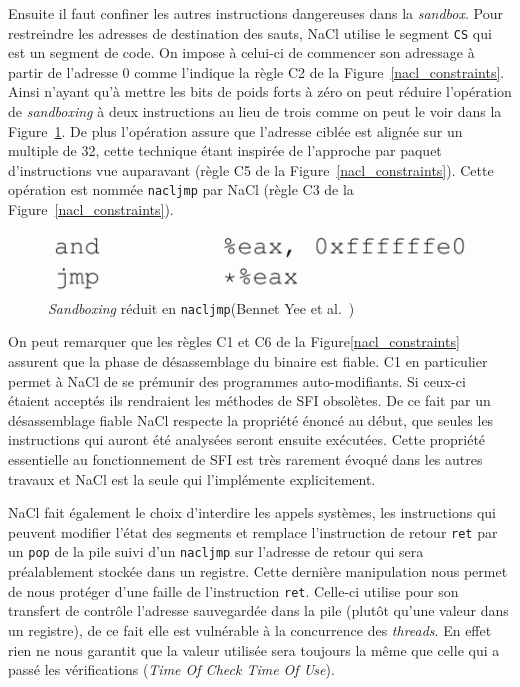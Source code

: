 \documentclass[11pt]{sdm}
\begin{document}
Ensuite il faut confiner les autres instructions dangereuses dans la \textit{sandbox}. Pour restreindre les adresses de destination des sauts, NaCl utilise le segment \texttt{CS} qui est un segment de code. On impose à celui-ci de commencer son adressage à partir de l'adresse 0 comme l'indique la règle C2 de la Figure~\ref{nacl_constraints}. Ainsi n'ayant qu'à mettre les bits de poids forts à zéro on peut réduire l'opération de \textit{sandboxing} à deux instructions au lieu de trois comme on peut le voir dans la Figure~\ref{nacl_jump}. De plus l'opération assure que l'adresse ciblée est alignée sur un multiple de 32, cette technique étant inspirée de l'approche par paquet d'instructions vue auparavant (règle C5 de la Figure~\ref{nacl_constraints}). Cette opération est nommée \texttt{nacljmp} par NaCl (règle C3 de la Figure~\ref{nacl_constraints}).

\begin{figure}[b]
\centering
\includegraphics[scale=0.22]{images/nacl_jump.png}
\caption{\textit{Sandboxing} réduit en \texttt{nacljmp}(Bennet Yee et al.~\cite{Yee:2010:NCS:1629175.1629203})}
\label{nacl_jump}
\end{figure}


On peut remarquer que les règles C1 et C6 de la Figure\ref{nacl_constraints} assurent que la phase de désassemblage du binaire est fiable. C1 en particulier permet à NaCl de se prémunir des programmes auto-modifiants. Si ceux-ci étaient acceptés ils rendraient les méthodes de SFI obsolètes.
De ce fait par un désassemblage fiable NaCl respecte la propriété énoncé au début, que seules les instructions qui auront été analysées seront ensuite exécutées. Cette propriété essentielle au fonctionnement de SFI est très rarement évoqué dans les autres travaux et NaCl est la seule qui l'implémente explicitement.

NaCl fait également le choix d'interdire les appels systèmes, les instructions qui peuvent modifier l'état des segments et remplace l'instruction de retour \texttt{ret} par un \texttt{pop} de la pile suivi d'un \texttt{nacljmp} sur l'adresse de retour qui sera préalablement stockée dans un registre. Cette dernière manipulation nous permet de nous protéger d'une faille de l'instruction \texttt{ret}. Celle-ci utilise pour son transfert de contrôle l'adresse sauvegardée dans la pile (plutôt qu'une valeur dans un registre), de ce fait elle est vulnérable à la concurrence des \textit{threads}. En effet rien ne nous garantit que la valeur utilisée sera toujours la même que celle qui a passé les vérifications (\textit{Time Of Check Time Of Use}).
\end{document}
